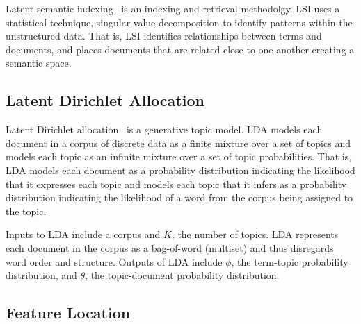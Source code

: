 Latent semantic indexing~\cite{Deerwester:1990} is an indexing and
retrieval methodolgy. LSI uses a statistical technique, singular value
decomposition to identify patterns within the unstructured data. That is,
LSI identifies relationships between terms and documents, and places
documents that are related close to one another creating a semantic space.


\subsection{Latent Dirichlet Allocation}

Latent Dirichlet allocation~\cite{Blei-etal:2003} is a generative topic model.
LDA models each document in a corpus of discrete data as a finite mixture over a set of topics
and models each topic as an infinite mixture over a set of topic probabilities.
That is, LDA models each document as a probability distribution
indicating the likelihood that it expresses each topic and
models each topic that it infers as a probability distribution
indicating the likelihood of a word from the corpus being assigned to the topic.

Inputs to LDA include a corpus and $K$, the number of topics.
LDA represents each document in the corpus as a bag-of-word (multiset)
and thus disregards word order and structure.
Outputs of LDA include $\phi$, the term-topic probability distribution,
and $\theta$, the topic-document probability distribution.


\subsection{Feature Location}

